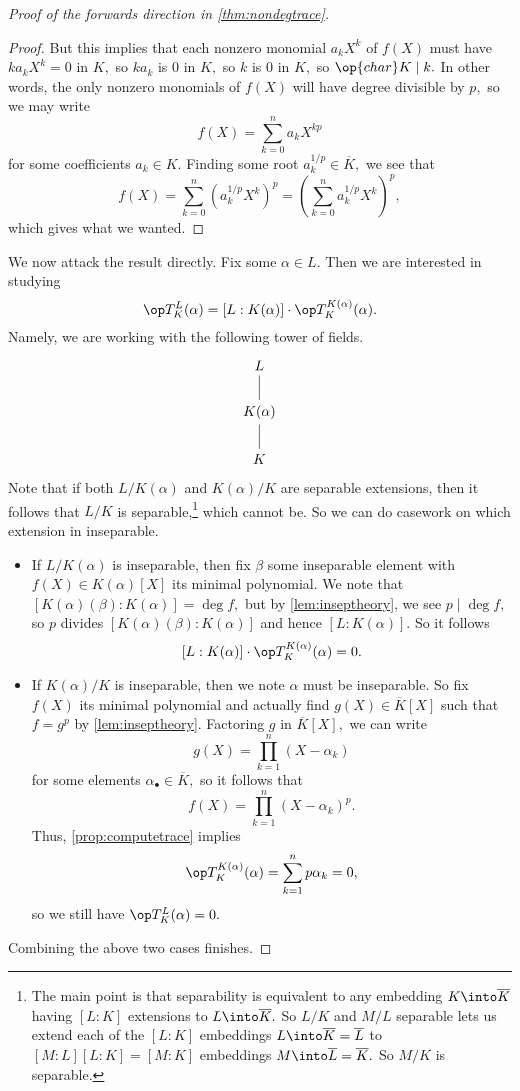 \documentclass[../notes.tex]{subfiles}
\begin{document}
\begin{proof}[Proof of the forwards direction in \autoref{thm:nondegtrace}]
\begin{proof}
		But this implies that each nonzero monomial $a_kX^k$ of $f(X)$ must have $ka_kX^k=0$ in $K,$ so $ka_k$ is $0$ in $K,$ so $k$ is $0$ in $K,$ so $\op{char}K\mid k.$ In other words, the only nonzero monomials of $f(X)$ will have degree divisible by $p,$ so we may write
		\[f(X)=\sum_{k=0}^na_kX^{kp}\]
		for some coefficients $a_k\in K.$ Finding some root $a_k^{1/p}\in\overline K,$ we see that
		\[f(X)=\sum_{k=0}^n\left(a_k^{1/p}X^k\right)^p=\left(\sum_{k=0}^na_k^{1/p}X^k\right)^p,\]
		which gives what we wanted.
	\end{proof}
	We now attack the result directly. Fix some $\alpha\in L.$ Then we are interested in studying
	\[\op T^L_K(\alpha)=[L:K(\alpha)]\cdot\op T_K^{K(\alpha)}(\alpha).\]
	Namely, we are working with the following tower of fields.
	\[\begin{tikzcd}
		L \\
		{K(\alpha)} \\
		K
		\arrow[no head, from=1-1, to=2-1]
		\arrow[no head, from=2-1, to=3-1]
	\end{tikzcd}\]
	Note that if both $L/K(\alpha)$ and $K(\alpha)/K$ are separable extensions, then it follows that $L/K$ is separable,\footnote{The main point is that separability is equivalent to any embedding $K\into\overline K$ having $[L:K]$ extensions to $L\into\overline K.$ So $L/K$ and $M/L$ separable lets us extend each of the $[L:K]$ embeddings $L\into\overline K=\overline L$ to $[M:L][L:K]=[M:K]$ embeddings $M\into\overline L=\overline K.$ So $M/K$ is separable.} which cannot be. So we can do casework on which extension in inseparable.
	\begin{itemize}
		\item If $L/K(\alpha)$ is inseparable, then fix $\beta$ some inseparable element with $f(X)\in K(\alpha)[X]$ its minimal polynomial. We note that $[K(\alpha)(\beta):K(\alpha)]=\deg f,$ but by \autoref{lem:inseptheory}, we see $p\mid\deg f,$ so $p$ divides $[K(\alpha)(\beta):K(\alpha)]$ and hence $[L:K(\alpha)].$ So it follows
		\[[L:K(\alpha)]\cdot\op T_K^{K(\alpha)}(\alpha)=0.\]
		\item If $K(\alpha)/K$ is inseparable, then we note $\alpha$ must be inseparable. So fix $f(X)$ its minimal polynomial and actually find $g(X)\in\overline K[X]$ such that $f=g^p$ by \autoref{lem:inseptheory}. Factoring $g$ in $\overline K[X],$ we can write
		\[g(X)=\prod_{k=1}^n(X-\alpha_k)\]
		for some elements $\alpha_\bullet\in\overline K,$ so it follows that
		\[f(X)=\prod_{k=1}^n(X-\alpha_k)^p.\]
		Thus, \autoref{prop:computetrace} implies
		\[\op T^{K(\alpha)}_K(\alpha)=\sum_{k=1}^np\alpha_k=0,\]
		so we still have $\op T^L_K(\alpha)=0.$
	\end{itemize}
	Combining the above two cases finishes.
\end{proof}
\end{document}
